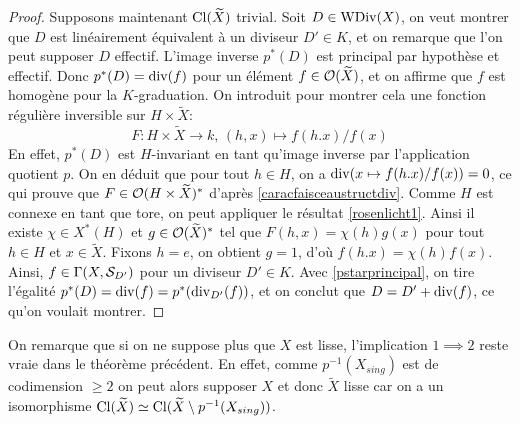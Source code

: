 \begin{proof}
Supposons maintenant $\operatorname{Cl}(\widetilde{X})$ trivial. Soit $D\in\operatorname{WDiv}(X)$, on veut montrer que $D$ est linéairement équivalent à un diviseur $D'\in K$, et on remarque que l'on peut supposer $D$ effectif. L'image inverse $p^*(D)$ est principal par hypothèse et effectif. Donc $p^*(D)=\operatorname{div}(f)$ pour un élément $f\in \mathcal{O}(\widetilde{X})$, et on affirme que $f$ est homogène pour la $K$-graduation. On introduit pour montrer cela une fonction régulière inversible sur $H\times \widetilde{X}$:
$$F:H\times \widetilde{X}\rightarrow k,\,(h,x)\mapsto f(h.x)/f(x)$$
En effet, $p^*(D)$ est $H$-invariant en tant qu'image inverse par l'application quotient $p$. On en déduit que pour tout $h\in H$, on a $\operatorname{div}(x\mapsto f(h.x)/f(x))=0$, ce qui prouve que $F\in \mathcal{O}(H\times \widetilde{X})^*$ d'après \ref{caracfaisceaustructdiv}. Comme $H$ est connexe en tant que tore, on peut appliquer le résultat \ref{rosenlicht1}. Ainsi il existe $\chi \in X^*(H)$ et $g\in\mathcal{O}(\widetilde{X})^*$ tel que $F(h,x)=\chi(h)g(x)$ pour tout $h\in H$ et $x\in \widetilde{X}$. Fixons $h=e$, on obtient $g=1$, d'où $f(h.x)=\chi(h)f(x)$. Ainsi, $f\in \Gamma(X, \mathcal{S}_{D'})$ pour un diviseur $D'\in K$. Avec \ref{pstarprincipal}, on tire l'égalité $p^*(D)=\operatorname{div}(f)=p^*(\operatorname{div}_{D'}(f))$, et on conclut que $D=D'+\operatorname{div}(f)$, ce qu'on voulait montrer.

\end{proof}

\begin{rem}
On remarque que si on ne suppose plus que $X$ est lisse, l'implication $1\implies 2$ reste vraie dans le théorème précédent. En effet, comme $p^{-1}(X_{sing})$ est de codimension $\geq 2$ on peut alors supposer $X$ et donc $\widetilde{X}$ lisse car on a un isomorphisme $\operatorname{Cl}(\widetilde{X})\simeq\operatorname{Cl}(\widetilde{X}\setminus p^{-1}(X_{sing}))$. 
\end{rem}


